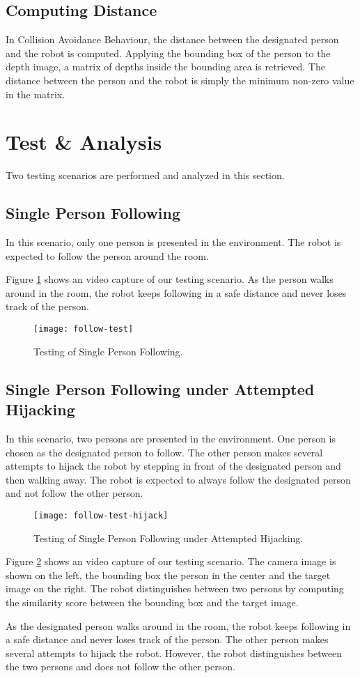 \subsection{Computing Distance}
In Collision Avoidance Behaviour, the distance between the designated person and the robot is computed.
Applying the bounding box of the person to the depth image, a matrix of depths inside the bounding area is retrieved.
The distance between the person and the robot is simply the minimum non-zero value in the matrix.

\section{Test \& Analysis}
Two testing scenarios are performed and analyzed in this section.

\subsection{Single Person Following}
In this scenario, only one person is presented in the environment.
The robot is expected to follow the person around the room.

Figure \ref{fig:follow-test} shows an video capture of our testing scenario.
As the person walks around in the room, the robot keeps following in a safe distance and never loses track of the person.

\begin{figure}
\centering
\texttt{[image: follow-test]}
\caption{Testing of Single Person Following.}
\label{fig:follow-test}
\end{figure}

\subsection{Single Person Following under Attempted Hijacking}
In this scenario, two persons are presented in the environment. One person is chosen as the designated person to follow.
The other person makes several attempts to hijack the robot by stepping in front of the designated person and then walking away.
The robot is expected to always follow the designated person and not follow the other person.

\begin{figure}
\centering
\texttt{[image: follow-test-hijack]}
\caption{Testing of Single Person Following under Attempted Hijacking.}
\label{fig:follow-test-hijack}
\end{figure}

Figure \ref{fig:follow-test-hijack} shows an video capture of our testing scenario.
The camera image is shown on the left, the bounding box the person in the center and the target image on the right.
The robot distinguishes between two persons by computing the similarity score between the bounding box and the target image.

As the designated person walks around in the room, the robot keeps following in a safe distance and never loses track of the person.
The other person makes several attempts to hijack the robot. However, the robot distinguishes between the two persons and does not follow the other person.

